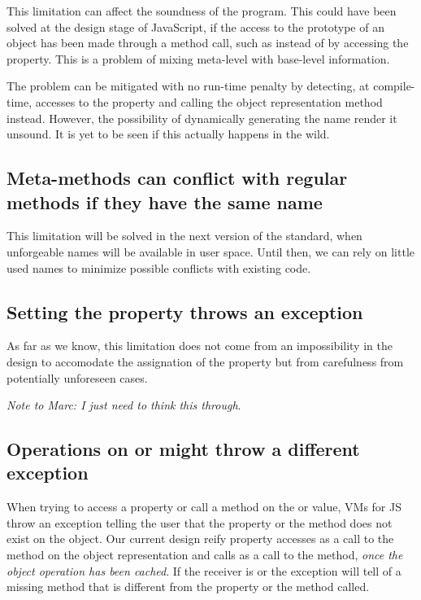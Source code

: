This limitation can affect the soundness of the program. This could have been
solved at the design stage of JavaScript, if the access to the prototype of an
object has been made through a method call, such as  instead
of by accessing the  property. This is a problem of mixing
meta-level with base-level information.

The problem can be mitigated with no run-time penalty by detecting, at
compile-time, accesses to the  property and calling the object
representation  method instead. However, the possibility of
dynamically generating the  name render it unsound. It
is yet to be seen if this actually happens in the wild.

\subsection{Meta-methods can conflict with regular methods if they have the same name}

This limitation will be solved in the next version of the standard, when
unforgeable names will be available in user space.  Until then, we can rely on
little used names to minimize possible conflicts with existing code.

\subsection{Setting the  property throws an exception}

As far as we know, this limitation does not come from an impossibility in the
design to accomodate the assignation of the  property but from
carefulness from potentially unforeseen cases. 

\textit{Note to Marc: I just need to think this through}. 


\subsection{Operations on  or  might throw a different exception}

When trying to access a property or call a method on the  or
 value, VMs for JS throw an exception telling the user that the
property or the method does not exist on the object. Our current design reify
property accesses as a call to the  method on the object representation
and calls as a call to the  method, \textit{once the object operation
has been cached}. If the receiver is  or  the exception
will tell of a missing method that is different from the property or the method
called.

